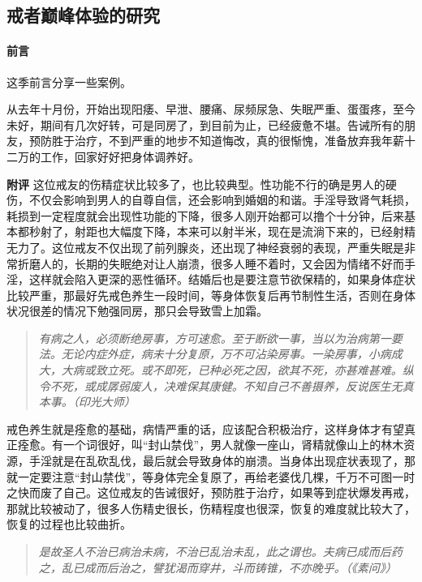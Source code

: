 \subsection{戒者巅峰体验的研究}

\paragraph*{前言}

这季前言分享一些案例。

\begin{case}
    从去年十月份，开始出现阳痿、早泄、腰痛、尿频尿急、失眠严重、蛋蛋疼，至今未好，期间有几次好转，可是同房了，到目前为止，已经疲惫不堪。告诫所有的朋友，预防胜于治疗，不到严重的地步不知道悔改，真的很惭愧，准备放弃我年薪十二万的工作，回家好好把身体调养好。

    \textbf{附评} 这位戒友的伤精症状比较多了，也比较典型。性功能不行的确是男人的硬伤，不仅会影响到男人的自尊自信，还会影响到婚姻的和谐。手淫导致肾气耗损，耗损到一定程度就会出现性功能的下降，很多人刚开始都可以撸个十分钟，后来基本都秒射了，射距也大幅度下降，本来可以射半米，现在是流淌下来的，已经射精无力了。这位戒友不仅出现了前列腺炎，还出现了神经衰弱的表现，严重失眠是非常折磨人的，长期的失眠绝对让人崩溃，很多人睡不着时，又会因为情绪不好而手淫，这样就会陷入更深的恶性循环。结婚后也是要注意节欲保精的，如果身体症状比较严重，那最好先戒色养生一段时间，等身体恢复后再节制性生活，否则在身体状况很差的情况下勉强同房，那只会导致雪上加霜。

    \begin{quote}\it
        有病之人，必须断绝房事，方可速愈。至于断欲一事，当以为治病第一要法。无论内症外症，病未十分复原，万不可沾染房事。一染房事，小病成大，大病或致立死。或不即死，已种必死之因，欲其不死，亦甚难甚难。纵令不死，或成孱弱废人，决难保其康健。不知自己不善摄养，反说医生无真本事。（印光大师）
    \end{quote}

    戒色养生就是痊愈的基础，病情严重的话，应该配合积极治疗，这样身体才有望真正痊愈。有一个词很好，叫“封山禁伐”，男人就像一座山，肾精就像山上的林木资源，手淫就是在乱砍乱伐，最后就会导致身体的崩溃。当身体出现症状表现了，那就一定要注意“封山禁伐”，等身体完全复原了，再给老婆伐几棵，千万不可图一时之快而废了自己。这位戒友的告诫很好，预防胜于治疗，如果等到症状爆发再戒，那就比较被动了，很多人伤精史很长，伤精程度也很深，恢复的难度就比较大了，恢复的过程也比较曲折。

    \begin{quote}\it
        是故圣人不治已病治未病，不治已乱治未乱，此之谓也。夫病已成而后药之，乱已成而后治之，譬犹渴而穿井，斗而铸锥，不亦晚乎。（《素问》）
    \end{quote}


\end{case}
